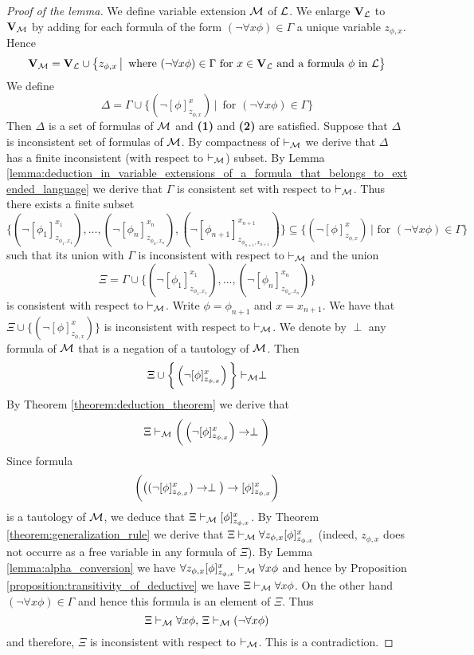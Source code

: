 \documentclass[10pt]{amsart}
\begin{document}
\begin{proof}[Proof of the lemma]
	We define variable extension ${\mathcal M}$ of ${\mathcal L}$. We enlarge $\mathbf{V}_{{\mathcal L}}$ to $\mathbf{V}_{{\mathcal M}}$ by adding for each formula of the form $(\neg\forall x\phi) \in \Gamma$ a unique variable $z_{\phi,x}$. Hence
	$$\mathbf{V}_{{\mathcal M}} = \mathbf{V}_{{\mathcal L}} \cup \big\{z_{\phi,x}\,\big|\,\mbox{ where }(\neg\forall x\phi) \in \Gamma\mbox{ for }x \in \mathbf{V}_{{\mathcal L}}\mbox{ and a formula }\phi\mbox{ in }{\mathcal L}\big\}$$
	We define
	$$\Delta = \Gamma \cup \big\{(\neg[\phi]^x_{z_{\phi,x}})\,\big|\,\mbox{ for $(\neg\forall x\phi) \in \Gamma$}\big\}$$
	Then $\Delta$ is a set of formulas of ${\mathcal M}$ and \textbf{(1)} and \textbf{(2)} are satisfied. Suppose that $\Delta$ is inconsistent set of formulas of ${\mathcal M}$. By compactness of $\vdash_{{\mathcal M}}$ we derive that $\Delta$ has a finite inconsistent (with respect to $\vdash_{{\mathcal M}}$) subset. By Lemma \ref{lemma:deduction_in_variable_extensions_of_a_formula_that_belongs_to_extended_language} we derive that $\Gamma$ is consistent set with respect to $\vdash_{{\mathcal M}}$. Thus there exists a finite subset $$\bigg\{\left(\neg[\phi_1]^{x_1}_{z_{\phi_1,x_1}}\right),...,\left(\neg[\phi_n]^{x_n}_{z_{\phi_n,x_n}}\right),\left(\neg[\phi_{n+1}]^{x_{n+1}}_{z_{\phi_{n+1},x_{n+1}}}\right)\bigg\} \subseteq \bigg\{\left(\neg[\phi]^x_{z_{\phi,x}}\right)\,\bigg| \mbox{ for } \left(\neg\forall x\phi\right) \in \Gamma\bigg\}$$
	such that its union with $\Gamma$ is inconsistent with respect to $\vdash_{{\mathcal M}}$ and the union
	$$\Xi = \Gamma \cup \bigg\{\left(\neg[\phi_1]^{x_1}_{z_{\phi_1,x_1}}\right),...,\left(\neg[\phi_n]^{x_n}_{z_{\phi_n,x_n}}\right)\bigg\}$$
	is consistent with respect to $\vdash_{{\mathcal M}}$. Write $\phi = \phi_{n+1}$ and $x = x_{n+1}$. We have that $\Xi \cup \bigg\{\left(\neg[\phi]^x_{z_{\phi,x}}\right)\bigg\}$ is inconsistent with respect to $\vdash_{{\mathcal M}}$. We denote by $\perp$ any formula of ${\mathcal M}$ that is a negation of a tautology of ${\mathcal M}$. Then
	$$\Xi \cup \bigg\{\left(\neg[\phi]^x_{z_{\phi,x}}\right)\bigg\} \vdash_{{\mathcal M}} \perp$$
	By Theorem \ref{theorem:deduction_theorem} we derive that
	$$\Xi \vdash_{{\mathcal M}} \bigg(\left(\neg[\phi]^x_{z_{\phi,x}}\right) \rightarrow \perp\bigg)$$
	Since formula
	$$\bigg (\big((\neg[\phi]^x_{z_{\phi,x}}) \rightarrow \perp \big) \rightarrow [\phi]^x_{z_{\phi,x}}\bigg)$$
	is a tautology of ${\mathcal M}$, we deduce that $\Xi \vdash_{{\mathcal M}} [\phi]^x_{z_{\phi,x}}$. By Theorem \ref{theorem:generalization_rule} we derive that $\Xi \vdash_{{\mathcal M}} \forall z_{\phi,x} [\phi]^x_{z_{\phi,x}}$ (indeed, $z_{\phi,x}$ does not occurre as a free variable in any formula of $\Xi$). By Lemma \ref{lemma:alpha_conversion} we have $\forall z_{\phi,x} [\phi]^x_{z_{\phi,x}} \vdash_{{\mathcal M}} \forall x\phi$ and hence by Proposition \ref{proposition:transitivity_of_deductive} we have $\Xi \vdash_{{\mathcal M}} \forall x\phi$. On the other hand $(\neg\forall x\phi) \in \Gamma$ and hence this formula is an element of $\Xi$. Thus
	$$\Xi \vdash_{{\mathcal M}} \forall x\phi,\, \Xi \vdash_{{\mathcal M}} (\neg\forall x\phi)$$
	and therefore, $\Xi$ is inconsistent with respect to $\vdash_{{\mathcal M}}$. This is a contradiction.
\end{proof}
\end{document}
